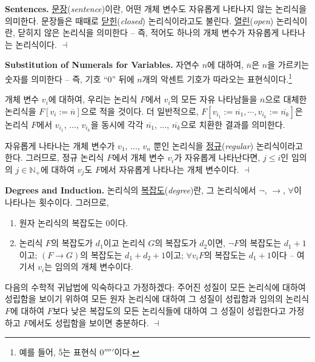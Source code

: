 \documentclass[12pt]{paper}
\newenvironment{context}[1][]{\noindent \textbf{{#1}.}}{\hfill $ \dashv $}
\begin{document}
  \begin{context}[Sentences]
    \underline{문장}(\textit{sentence})이란, 어떤 개체 변수도 자유롭게 나타나지 않는 논리식을 의미한다.
    문장들은 때때로 \underline{닫힌}(\textit{closed}) 논리식이라고도 불린다.
    \underline{열린}(\textit{open}) 논리식이란, 닫히지 않은 논리식을 의미한다 --
    즉, 적어도 하나의 개체 변수가 자유롭게 나타나는 논리식이다.
  \end{context}

  \begin{context}[Substitution of Numerals for Variables]
    자연수 $n$에 대하여, $\overline{n}$은 $n$을 가르키는 숫자를 의미한다 --
    즉, 기호 ``$0$'' 뒤에 $n$개의 악센트 기호가 따라오는 표현식이다.\footnote
    {
      예를 들어, $\overline{5}$는 표현식 $0'''''$이다.
    }

    개체 변수 $v_{i}$에 대하여, 우리는 논리식 $F$에서 $v_{i}$의 모든 자유 나타남들을 $\overline{n}$으로 대체한 논리식을 $F \left[ v_{i} := \overline{n} \right]$으로 적을 것이다.
    더 일반적으로, $F \left[ v_{i_{1}} := \overline{n_{1}} , \cdots , v_{i_{k}} := \overline{n_{k}} \right]$은 논리식 $F$에서 $v_{i_{1}}$, ..., $v_{i_{k}}$을 동시에 각각 $\overline{n_{1}}$, ..., $\overline{n_{k}}$으로 치환한 결과를 의미한다.

    자유롭게 나타나는 개체 변수가 $v_{1}$, ..., $v_{n}$ 뿐인 논리식을 \underline{정규}(\textit{regular}) 논리식이라고 한다.
    그러므로, 정규 논리식 $F$에서 개체 변수 $v_{i}$가 자유롭게 나타난다면,
    $j \leq i$인 임의의 $j \in \mathbb{N}_{+}$에 대하여 $v_{j}$도 $F$에서 자유롭게 나타나는 개체 변수이다.
  \end{context}

  \begin{context}[Degrees and Induction]
    논리식의 \underline{복잡도}(\textit{degree})란, 그 논리식에서 $\lnot$, $\rightarrow$, $\forall$이 나타나는 횟수이다.
    그러므로,
    \begin{enumerate}
      \item 원자 논리식의 복잡도는 $0$이다.
      \item 논리식 $F$의 복잡도가 $d_{1}$이고 논리식 $G$의 복잡도가 $d_{2}$이면,
      $\lnot F$의 복잡도는 $d_{1} + 1$이고;
      $\left( F \rightarrow G \right)$의 복잡도는 $d_{1} + d_{2} + 1$이고;
      $\forall v_{i} F$의 복잡도는 $d_{1} + 1$이다 --
      여기서 $v_{i}$는 임의의 개체 변수이다.
    \end{enumerate}

    다음의 수학적 귀납법에 익숙하다고 가정하겠다:
    주어진 성질이 모든 논리식에 대하여 성립함을 보이기 위하여
    모든 원자 논리식에 대하여 그 성질이 성립함과
    임의의 논리식 $F$에 대하여 $F$보다 낮은 복잡도의 모든 논리식들에 대하여 그 성질이 성립한다고 가정하고
    $F$에서도 성립함을 보이면 충분하다.
  \end{context}
\end{document}
